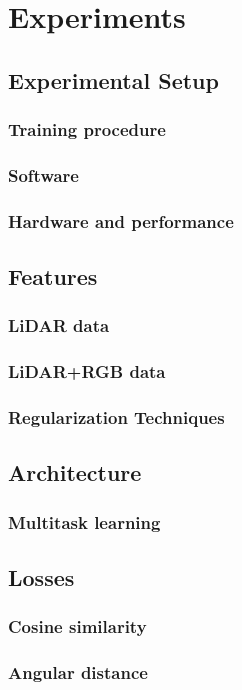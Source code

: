 \chapter{Experiments}%
\label{sec:experiments}

\section{Experimental Setup}
\subsection{Training procedure}
\subsection{Software}
\subsection{Hardware and performance}

\section{Features}
\subsection{LiDAR data}
\subsection{LiDAR+RGB data}

\subsection{Regularization Techniques}%
\label{sec:technique-experiments}


\section{Architecture}
\subsection{Multitask learning}

\section{Losses}
\subsection{Cosine similarity}
\subsection{Angular distance}
